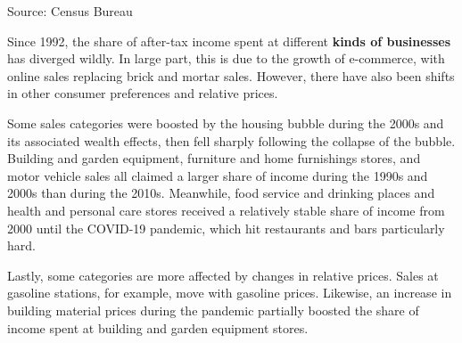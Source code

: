 \documentclass{report}
\makeatletter
\newcommand{\tbllink}[1]{\href{https://raw.githubusercontent.com/bdecon/US-chartbook/master/chartbook/data/#1}{\faTable}}
\newcommand*\short[1]{\expandafter\@gobbletwo\number\numexpr#1\relax}
\newcommand{\absnode}[3]{\node[below right, align=left] at (axis cs: #1,#2) {#3};}
\newcommand{\dateaxisticks}{
		date coordinates in=x, axis line style={draw=none},
		xmax={2023-11-01},
		max space between ticks=40,	    
		xtick={{1990-01-01}, {1992-01-01}, {1994-01-01}, 
			{1996-01-01}, {1998-01-01}, {2000-01-01}, 
			{2002-01-01}, {2004-01-01}, {2006-01-01},
			{2008-01-01}, {2010-01-01}, {2012-01-01}, {2014-01-01},
		    {2016-01-01}, {2018-01-01}, {2020-01-01}, {2022-01-01}, 
		    {2024-01-01}, {2026-01-01}},
		minor xtick={{1989-01-01}, {1991-01-01}, {1993-01-01},
			{1995-01-01}, {1997-01-01}, {1999-01-01}, 
			{2001-01-01}, {2003-01-01}, {2005-01-01}, {2007-01-01},
		    {2009-01-01}, {2011-01-01}, {2013-01-01}, {2015-01-01},
		    {2017-01-01}, {2019-01-01}, {2021-01-01}, {2023-01-01}, 
		    {2025-01-01}, {2027-01-01}},
		enlarge y limits={0.06}, enlarge x limits={0.01},
		}
\newcommand{\bbar}[2]{extra #1 ticks = {{#2}}, extra #1 tick labels = ,
		extra #1 tick style = {grid=major, grid style={thick, black!25}},}
\newcommand{\stdline}[4]{\addplot[very thick, no markers, color=#1] 
		table [x=#2, y=#3, col sep=comma] {#4};	}
\newcommand{\thickline}[4]{\addplot[ultra thick, no markers, color=#1] 
		table [x=#2, y=#3, col sep=comma] {#4};	}
\newcommand{\rebars}{
		\fill[color=black!10] (axis cs:{2007-12-01},\pgfkeysvalueof{/pgfplots/ymin}) rectangle 
			(axis cs:{2009-07-01}, \pgfkeysvalueof{/pgfplots/ymax});
		\fill[color=black!10] (axis cs:{2001-03-01},\pgfkeysvalueof{/pgfplots/ymin}) rectangle 
			(axis cs:{2001-11-01}, \pgfkeysvalueof{/pgfplots/ymax});
		\fill[color=black!10] (axis cs:{2020-02-01},\pgfkeysvalueof{/pgfplots/ymin}) rectangle 
			(axis cs:{2020-05-01}, \pgfkeysvalueof{/pgfplots/ymax});}
\makeatother
\begin{document}
{\begin{minipage}{0.76\textwidth}
\hspace{3mm} 

\footnotesize{Source: Census Bureau} \hfill \tbllink{marts.csv}
\end{minipage}
\newpage
\begin{minipage}{0.76\textwidth}  
\small Since 1992, the share of after-tax income spent at different \textbf{kinds of businesses} has diverged wildly. In large part, this is due to the growth of e-commerce, with online sales replacing brick and mortar sales. However, there have also been shifts in other consumer preferences and relative prices. 

 

Some sales categories were boosted by the housing bubble during the 2000s and its associated wealth effects, then fell sharply following the collapse of the bubble. Building and garden equipment, furniture and home furnishings stores, and motor vehicle sales all claimed a larger share of income during the 1990s and 2000s than during the 2010s. Meanwhile, food service and drinking places and health and personal care stores received a relatively stable share of income from 2000 until the COVID-19 pandemic, which hit restaurants and bars particularly hard. 

Lastly, some categories are more affected by changes in relative prices. Sales at gasoline stations, for example, move with gasoline prices. Likewise, an increase in building material prices during the pandemic partially boosted the share of income spent at building and garden equipment stores. 
\end{minipage}
\vspace{2mm}

}
\end{document}
